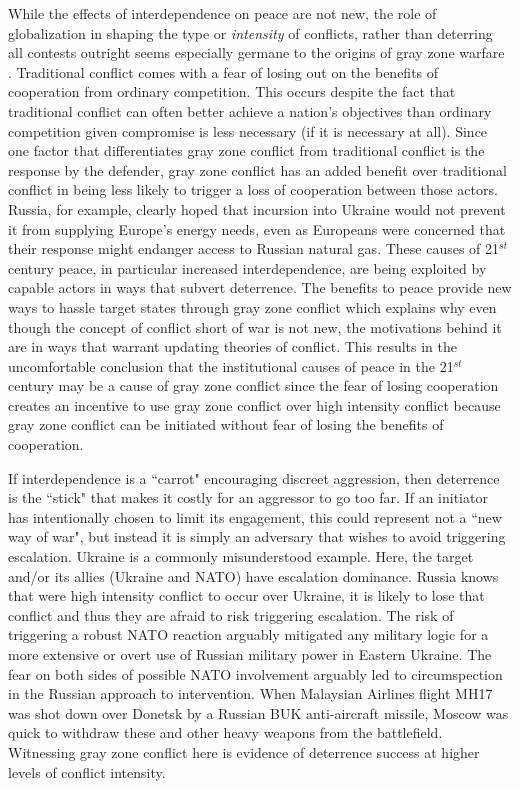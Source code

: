 \documentclass[12pt,letterpaper]{article}
\begin{document}
			While the effects of interdependence on peace are not new, the role of globalization in shaping the type or \textit{intensity} of conflicts, rather than deterring all contests outright seems especially germane to the origins of gray zone warfare \citep{gartzke_measuremeasureconcept_2003, gartzke_complexstructurecommercial_2016}. Traditional conflict comes with a fear of losing out on the benefits of cooperation from ordinary competition. This occurs despite the fact that traditional conflict can often better achieve a nation's objectives than ordinary competition given compromise is less necessary (if it is necessary at all). Since one factor that differentiates gray zone conflict from traditional conflict is the response by the defender, gray zone conflict has an added benefit over traditional conflict in being less likely to trigger a loss of cooperation between those actors. Russia, for example, clearly hoped that incursion into Ukraine would not prevent it from supplying Europe's energy needs, even as Europeans were concerned that their response might endanger access to Russian natural gas. These causes of 21$^{st}$ century peace, in particular increased interdependence, are being exploited by capable actors in ways that subvert deterrence. The benefits to peace provide new ways to hassle target states through gray zone conflict which explains why even though the concept of conflict short of war is not new, the motivations behind it are in ways that warrant updating theories of conflict. This results in the uncomfortable conclusion that the institutional causes of peace in the 21$^{st}$ century may be a cause of gray zone conflict since the fear of losing cooperation creates an incentive to use gray zone conflict over high intensity conflict because gray zone conflict can be initiated without fear of losing the benefits of cooperation.
							
			If interdependence is a ``carrot" encouraging discreet aggression, then deterrence is the ``stick" that makes it costly for an aggressor to go too far. If an initiator has intentionally chosen to limit its engagement, this could represent not a ``new way of war", but instead it is simply an adversary that wishes to avoid triggering escalation. Ukraine is a commonly misunderstood example. Here, the target and/or its allies (Ukraine and NATO) have escalation dominance. Russia knows that were high intensity conflict to occur over Ukraine, it is likely to lose that conflict and thus they are afraid to risk triggering escalation. The risk of triggering a robust NATO reaction arguably mitigated any military logic for a more extensive or overt use of Russian military power in Eastern Ukraine. The fear on both sides of possible NATO involvement arguably led to circumspection in the Russian approach to intervention. When Malaysian Airlines flight MH17 was shot down over Donetsk by a Russian BUK anti-aircraft missile, Moscow was quick to withdraw these and other heavy weapons from the battlefield. Witnessing gray zone conflict here is evidence of deterrence success at higher levels of conflict intensity.
			
\end{document}
